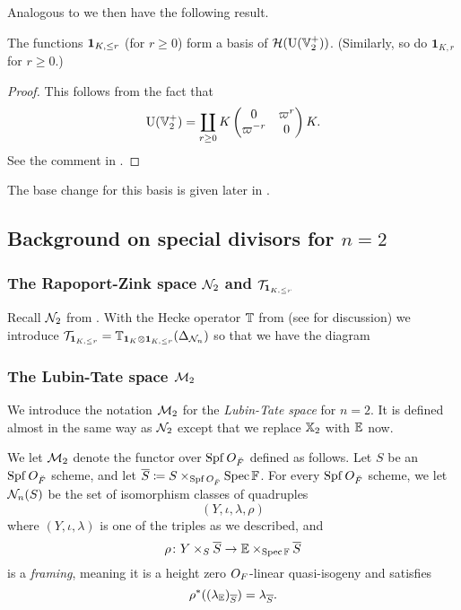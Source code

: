 Analogous to  we then have the following result.
\begin{proposition}[$\fr$ basis]
  The functions $\fr$ (for $r \ge 0$) form a basis of $\mathcal H(\operatorname{U}(\mathbb V_2^+))$.
  (Similarly, so do $\mathbf{1}_{K, r}$ for $r \ge 0$.)
\end{proposition}
\begin{proof}
  This follows from the fact that
  \[ \operatorname{U}(\mathbb V_2^+) = \coprod_{r \ge 0}
    K \begin{pmatrix} 0 & \varpi^r \\ \varpi^{-r} & 0 \end{pmatrix} K. \]
  See the comment in \cite[Equation (7.1.5)]{ref:AFLspherical}.
\end{proof}

The base change for this basis is given later in .

\subsection{Background on special divisors for $n = 2$}
\subsubsection{The Rapoport-Zink space $\mathcal N_2$ and $\mathcal{T}_{\mathbf{1}_{K, \le r}}$}
Recall $\mathcal N_2$ from .
With the Hecke operator $\mathbb T$ from \cite{ref:AFLspherical}
(see  for discussion)
we introduce $\mathcal{T}_{\mathbf{1}_{K, \le r}} = \mathbb T_{\mathbf{1}_K \otimes \mathbf{1}_{K, \le r}}(\Delta_{\mathcal N_n})$
so that we have the diagram
\begin{center}
\end{center}

\subsubsection{The Lubin-Tate space $\mathcal M_2$}
We introduce the notation $\mathcal M_2$ for the \emph{Lubin-Tate space} for $n = 2$.
It is defined almost in the same way as $\mathcal N_2$ except that we replace
$\mathbb X_2$ with $\mathbb E$ now.

\begin{definition}
  We let $\mathcal M_2$ denote the functor over $\operatorname{Spf} O_{\breve F}$ defined as follows.
  Let $S$ be an $\operatorname{Spf} O_{\breve F}$ scheme, and let
  $\overline S \coloneqq S \times_{\operatorname{Spf} O_{\breve F}} \operatorname{Spec} \mathbb F$.
  For every $\operatorname{Spf} O_{\breve F}$ scheme, we let $\mathcal N_n(S)$
  be the set of isomorphism classes of quadruples
  \[ (Y, \iota, \lambda, \rho) \]
  where $(Y, \iota, \lambda)$ is one of the triples as we described, and
  \[ \rho \colon Y \times_S \overline S \to \mathbb E \times_{\operatorname{Spec} \mathbb F} \overline S \]
  is a \emph{framing}, meaning it is a height zero $O_F$-linear quasi-isogeny
  and satisfies
  \[ \rho^\ast((\lambda_{\mathbb E})_{\overline S}) = \lambda_{\overline S}. \]
\end{definition}

